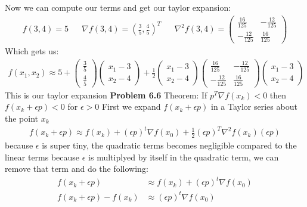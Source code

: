 \documentclass{article}
\begin{document}
Now we can compute our terms and get our taylor expansion:
\begin{align*}
    f(3, 4) = 5 && \nabla f(3,4) = (\frac{3}{5},\frac{4}{5})^T && 
    \nabla^2 f(3,4) = \begin{pmatrix} \frac{16}{125} & -\frac{12}{125} \\ -\frac{12}{125} & \frac{16}{125} \end{pmatrix}
\end{align*}
Which gets us:
\begin{align*}
    f(x_1, x_2) \approx 5 + \begin{pmatrix} \frac{3}{5} \\ \frac{4}{5} \end{pmatrix}  
            \begin{pmatrix}
                x_1 - 3 \\ x_2 - 4
            \end{pmatrix} + \frac{1}{2} 
            \begin{pmatrix}
                x_1 - 3 \\ x_2 - 4
            \end{pmatrix}
            \begin{pmatrix} \frac{16}{125} & -\frac{12}{125} \\ -\frac{12}{125} & \frac{16}{125} \end{pmatrix}
            \begin{pmatrix}
                x_1 - 3 \\ x_2 - 4
            \end{pmatrix}
\end{align*} This is our taylor expansion \newline
\textbf{Problem 6.6} Theorem: If $ p^T \nabla f(x_k) < 0$ then $f(x_k + \epsilon p) < 0$ for $\epsilon > 0$
\proof First we expand $f(x_k + \epsilon p)$ in a Taylor series about the point $x_k$
\begin{align*}
    f(x_k + \epsilon p) \approx f(x_k) + (\epsilon p)^t \nabla f(x_0) + \frac{1}{2} (\epsilon p )^T \nabla^2 f(x_k)(\epsilon p)
\end{align*}
because $\epsilon$ is super tiny, the quadratic terms becomes negligible compared to the linear terms because  $\epsilon$ is multiplyed by itself in the quadratic term, we can remove that term and do the following:
\begin{align*}
    f(x_k + \epsilon p) & \approx f(x_k) + (\epsilon p)^t \nabla f(x_0) \\
    f(x_k + \epsilon p) - f(x_k) & \approx (\epsilon p)^t \nabla f(x_0)
\end{align*}
\end{document}
